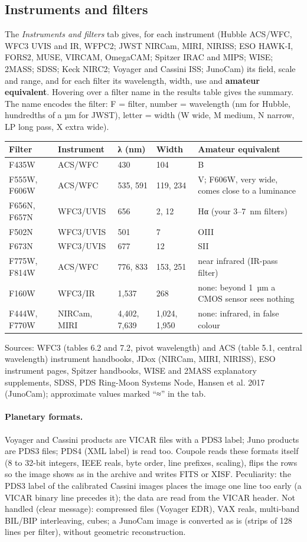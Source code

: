 \subsection{Instruments and filters}
The \emph{Instruments and filters} tab gives, for each instrument (Hubble ACS/WFC, WFC3 UVIS and IR, WFPC2; JWST
NIRCam, MIRI, NIRISS; ESO HAWK-I, FORS2, MUSE, VIRCAM, OmegaCAM; Spitzer IRAC and MIPS; WISE; 2MASS; SDSS; Keck NIRC2;
Voyager and Cassini ISS; JunoCam) its field, scale and range, and for each filter its wavelength, width, use and
\textbf{amateur equivalent}. Hovering over a filter name in the results table gives the summary. The name encodes the
filter: F = filter, number = wavelength (nm for Hubble, hundredths of a µm for JWST), letter = width (W wide, M medium,
N narrow, LP long pass, X extra wide).
\begin{center}\small
\begin{tabularx}{\linewidth}{@{}llllX@{}}
\toprule
\textbf{Filter} & \textbf{Instrument} & \textbf{λ (nm)} & \textbf{Width} & \textbf{Amateur equivalent}\\
\midrule
F435W & ACS/WFC & 430 & 104 & B\\
F555W, F606W & ACS/WFC & 535, 591 & 119, 234 & V; F606W, very wide, comes close to a luminance\\
F656N, F657N & WFC3/UVIS & 656 & 2, 12 & Hα (your 3–7~nm filters)\\
F502N & WFC3/UVIS & 501 & 7 & OIII\\
F673N & WFC3/UVIS & 677 & 12 & SII\\
F775W, F814W & ACS/WFC & 776, 833 & 153, 251 & near infrared (IR-pass filter)\\
F160W & WFC3/IR & 1,537 & 268 & none: beyond 1~µm a CMOS sensor sees nothing\\
F444W, F770W & NIRCam, MIRI & 4,402, 7,639 & 1,024, 1,950 & none: infrared, in false colour\\
\bottomrule
\end{tabularx}
\end{center}
Sources: WFC3 (tables 6.2 and 7.2, pivot wavelength) and ACS (table 5.1, central wavelength) instrument handbooks, JDox
(NIRCam, MIRI, NIRISS), ESO instrument pages, Spitzer handbooks, WISE and 2MASS explanatory supplements, SDSS, PDS
Ring-Moon Systems Node, Hansen et al. 2017 (JunoCam); approximate values marked ``≈'' in the tab.

\paragraph{Planetary formats.} Voyager and Cassini products are VICAR files with a PDS3 label; Juno products are PDS3
files; PDS4 (XML label) is read too. Coupole reads these formats itself (8 to 32-bit integers, IEEE reals, byte
order, line prefixes, scaling), flips the rows so the image shows as in the archive and writes FITS or XISF.
Peculiarity: the PDS3 label of the calibrated Cassini images places the image one line too early (a VICAR binary line
precedes it); the data are read from the VICAR header. Not handled (clear message): compressed files (Voyager EDR),
VAX reals, multi-band BIL/BIP interleaving, cubes; a JunoCam image is converted as is (strips of 128 lines per
filter), without geometric reconstruction.

